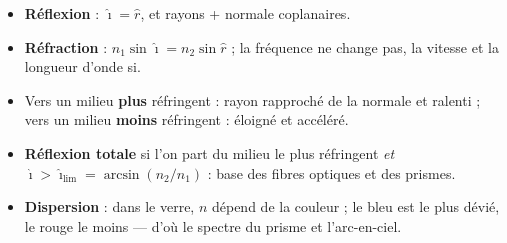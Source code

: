 \documentclass[11pt,a4paper]{article}
\newcommand{\angi}{\hat{\imath}}     %
\newcommand{\angr}{\hat{r}}          %
\begin{document}
\begin{tcolorbox}[boxbase,colback=primarydark!6,colframe=primarydark,
   title={\textsc{L'essentiel de la Fiche 7}}]
\begin{itemize}[leftmargin=1.5em,topsep=2pt,itemsep=2pt]
  \item \textbf{Réflexion} : $\angi = \angr$, et rayons + normale coplanaires.
  \item \textbf{Réfraction} : $n_1\sin\angi = n_2\sin\angr$ ; la fréquence ne change pas, la vitesse
        et la longueur d'onde si.
  \item Vers un milieu \textbf{plus} réfringent : rayon rapproché de la normale et ralenti ; vers un
        milieu \textbf{moins} réfringent : éloigné et accéléré.
  \item \textbf{Réflexion totale} si l'on part du milieu le plus réfringent \emph{et}
        $\angi > \angi_{\text{lim}} = \arcsin(n_2/n_1)$ : base des fibres optiques et des prismes.
  \item \textbf{Dispersion} : dans le verre, $n$ dépend de la couleur ; le bleu est le plus dévié,
        le rouge le moins — d'où le spectre du prisme et l'arc-en-ciel.
\end{itemize}
\end{tcolorbox}
\end{document}
